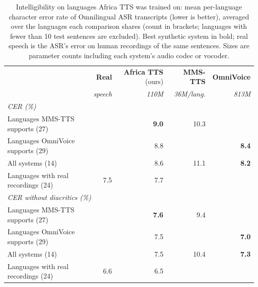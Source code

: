 \begin{table}[t]
\centering
\small
\begin{tabular}{lrrrr}
\toprule
 & \textbf{Real} & \textbf{Africa TTS} (ours) & \textbf{MMS-TTS} & \textbf{OmniVoice} \\
 & \textit{speech} & \textit{110M} & \textit{36M/lang.} & \textit{813M} \\
\midrule
\multicolumn{5}{l}{\textit{CER (\%)}} \\
Languages MMS-TTS supports (27) &  & \textbf{9.0} & 10.3 &  \\
Languages OmniVoice supports (29) &  & 8.8 &  & \textbf{8.4} \\
All systems (14) &  & 8.6 & 11.1 & \textbf{8.2} \\
Languages with real recordings (24) & 7.5 & 7.7 &  &  \\
\midrule
\multicolumn{5}{l}{\textit{CER without diacritics (\%)}} \\
Languages MMS-TTS supports (27) &  & \textbf{7.6} & 9.4 &  \\
Languages OmniVoice supports (29) &  & 7.5 &  & \textbf{7.0} \\
All systems (14) &  & 7.5 & 10.4 & \textbf{7.3} \\
Languages with real recordings (24) & 6.6 & 6.5 &  &  \\
\bottomrule
\end{tabular}
\caption{Intelligibility on languages Africa TTS was trained on: mean per-language character error rate of Omnilingual ASR transcripts (lower is better), averaged over the languages each comparison shares (count in brackets; languages with fewer than 10 test sentences are excluded). Best synthetic system in bold; real speech is the ASR's error on human recordings of the same sentences. Sizes are parameter counts including each system's audio codec or vocoder.}
\label{tab:averages}
\end{table}
